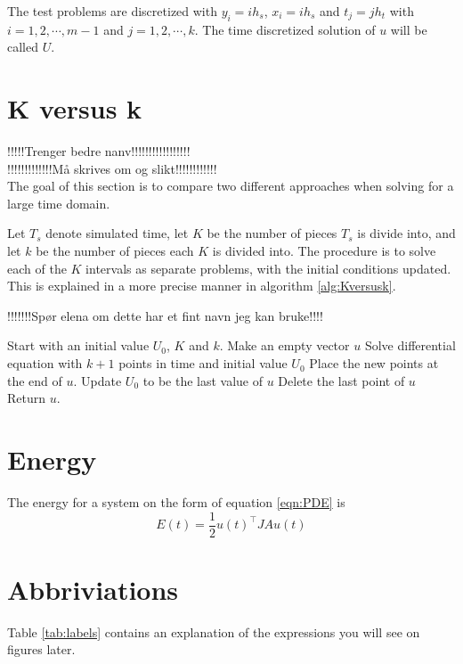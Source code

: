The test problems are discretized with $y_i = i h_s$, $x_i = i h_s$ and $t_j = j h_t$ with $i = 1,2,\cdots,m-1 $ and $ j = 1,2,\cdots,k $. The time discretized solution of $u$ will be called $U$.

\section{K versus k}%
!!!!!Trenger bedre nanv!!!!!!!!!!!!!!!!!\\
!!!!!!!!!!!!!Må skrives om og slikt!!!!!!!!!!!!\\
The goal of this section is to compare two different approaches when solving for a large time domain.

Let $T_s$ denote simulated time, let $K$ be the number of pieces $T_s$ is divide into, and let $k$ be the number of pieces each $K$ is divided into. The procedure is to solve each of the $K$ intervals as separate problems, with the initial conditions updated. This is explained in a more precise manner in algorithm \ref{alg:Kversusk}.

\begin{algorithm} [h!]
\begin{algorithmic} \caption{!!!!!!!Spør elena om dette har et fint navn jeg kan bruke!!!!} \label{alg:Kversusk}  
\STATE Start with an initial value $U_0$, $K$ and $k$.
\STATE Make an empty vector $u$
   \STATE Solve differential equation with $k+1$ points in time and initial value $U_0$
   \STATE Place the new points at the end of $u$.
   \STATE Update $U_0$ to be the last value of $u$ 
   \STATE Delete the last point of $u$
\ENDFOR
\STATE Return $u$.
\end{algorithmic} 
\end{algorithm}

\section{Energy}%
The energy for a system on the form of equation \ref{eqn:PDE} is
\begin{equation}
E(t) = \frac{1}{2} u(t)^\top J A u(t)
\label{eqn:energy}
\end{equation}

\section{Abbriviations}%
Table \ref{tab:labels} contains an explanation of the expressions you will see on figures later.

